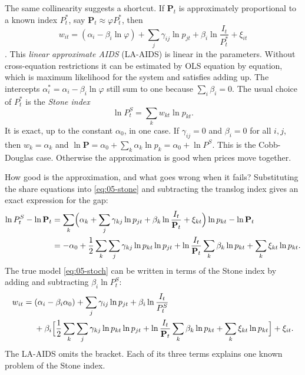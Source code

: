 The same collinearity suggests a shortcut. If $\mathbf{P}_t$ is approximately proportional to a known
index $P_t^*$, say $\mathbf{P}_t \approx \varphi P_t^*$, then
\begin{equation}\label{eq:05-la-aids}
  w_{it} = (\alpha_i - \beta_i\ln\varphi) + \sum_j\gamma_{ij}\ln p_{jt}
  + \beta_i\ln\frac{I_t}{P_t^*} + \xi_{it}
\end{equation}
\citep[eq.~16]{DeatonMuellbauer1980a}. This \emph{linear approximate AIDS} (LA-AIDS) is linear in the
parameters. Without cross-equation restrictions it can be estimated by OLS equation by equation, which is
maximum likelihood for the system and satisfies adding up. The intercepts $\alpha_i^* = \alpha_i -
\beta_i\ln\varphi$ still sum to one because $\sum_i\beta_i = 0$. The usual choice of $P_t^*$ is the
\emph{Stone index}
\begin{equation}\label{eq:05-stone}
  \ln P_t^S = \sum_k w_{kt}\ln p_{kt}.
\end{equation}
It is exact, up to the constant $\alpha_0$, in one case. If $\gamma_{ij} = 0$ and $\beta_i = 0$ for all
$i, j$, then $w_k = \alpha_k$ and $\ln\mathbf{P} = \alpha_0 + \sum_k\alpha_k\ln p_k = \alpha_0 + \ln P^S$.
This is the Cobb-Douglas case. Otherwise the approximation is good when prices move together.

How good is the approximation, and what goes wrong when it fails? Substituting the share equations into
\eqref{eq:05-stone} and subtracting the translog index gives an exact expression for the gap:
\begin{align}
  \ln P_t^S - \ln\mathbf{P}_t
  &= \sum_k\Bigl(\alpha_k + \sum_j\gamma_{kj}\ln p_{jt} + \beta_k\ln\frac{I_t}{\mathbf{P}_t}
     + \xi_{kt}\Bigr)\ln p_{kt} - \ln\mathbf{P}_t \notag\\
  &= -\alpha_0 + \frac{1}{2}\sum_k\sum_j\gamma_{kj}\ln p_{kt}\ln p_{jt}
     + \ln\frac{I_t}{\mathbf{P}_t}\sum_k\beta_k\ln p_{kt} + \sum_k\xi_{kt}\ln p_{kt}.
  \label{eq:05-stone-gap}
\end{align}
The true model \eqref{eq:05-stoch} can be written in terms of the Stone index by adding and subtracting
$\beta_i\ln P^S_t$:
\begin{equation}\label{eq:05-la-exact}
\begin{split}
  w_{it} = {}& (\alpha_i - \beta_i\alpha_0) + \sum_j\gamma_{ij}\ln p_{jt} + \beta_i\ln\frac{I_t}{P^S_t} \\
  &+ \beta_i\Bigl[\frac{1}{2}\sum_k\sum_j\gamma_{kj}\ln p_{kt}\ln p_{jt}
  + \ln\frac{I_t}{\mathbf{P}_t}\sum_k\beta_k\ln p_{kt} + \sum_k\xi_{kt}\ln p_{kt}\Bigr] + \xi_{it}.
\end{split}
\end{equation}
The LA-AIDS omits the bracket. Each of its three terms explains one known problem of the Stone index.

